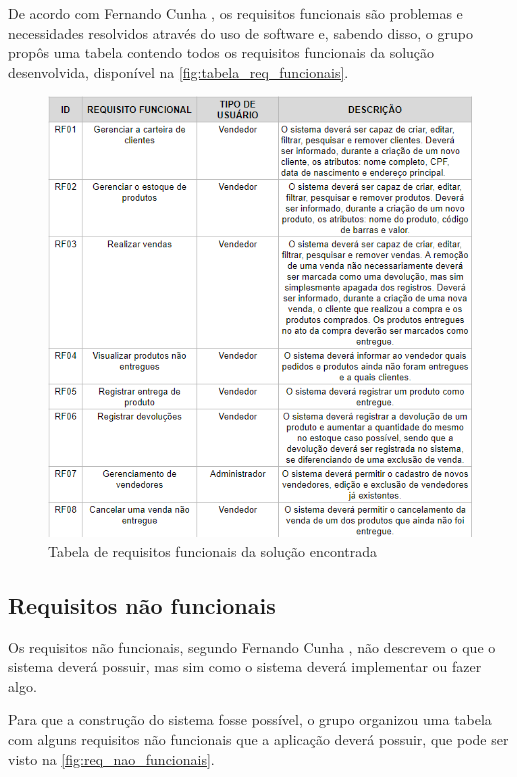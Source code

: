 \documentclass[serif, english, brazilian, oneside]{uffstex}
\begin{document}
De acordo com Fernando Cunha \cite{requisitos-o-que-sao}, os requisitos funcionais são problemas e necessidades resolvidos através do uso de software e, sabendo disso, o grupo propôs uma tabela contendo todos os requisitos funcionais da solução desenvolvida, disponível na \autoref{fig:tabela_req_funcionais}.

\newpage

\begin{figure}[!htpb]
    \centering
    \caption{Tabela de requisitos funcionais da solução encontrada}
    \label{fig:tabela_req_funcionais}
    \includegraphics[width=\linewidth]{imagens/tabela_req_funcionais.png}
\end{figure}

\subsection{Requisitos não funcionais}

Os requisitos não funcionais, segundo Fernando Cunha \cite{requisitos-o-que-sao}, não descrevem o que o sistema deverá possuir, mas sim como o sistema deverá implementar ou fazer algo.

Para que a construção do sistema fosse possível, o grupo organizou uma tabela com alguns requisitos não funcionais que a aplicação deverá possuir, que pode ser visto na \autoref{fig:req_nao_funcionais}.
\end{document}

